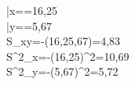 \bar{x}==16,25\\
\bar{y}==5,67\\
S_{xy}=-(16,25,67)=4,83\\
S^2_{x}=-(16,25)^2=10,69\\
S^2_{y}=-(5,67)^2=5,72
